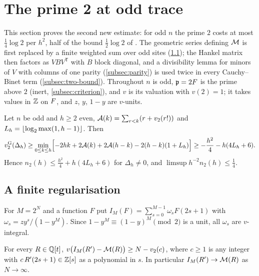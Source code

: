 \section{The prime 2 at odd trace}\label{sec:prime-two}

This section proves the second new estimate: for odd $n$ the prime $2$ costs at most
$\frac14\log2$ per $h^2$, half of the bound $\frac12\log2$ of \cite[Lemma~8.1]{Krisman2026units}.
The geometric series defining $\mathcal{M}$ is first replaced by a finite weighted sum over odd sites
(\cref{subsec:regularisation}); the Hankel matrix then factors as $VBV^{\mathsf T}$ with $B$ block
diagonal, and a divisibility lemma for minors of $V$ with columns of one parity
(\cref{subsec:parity}) is used twice in every Cauchy--Binet term (\cref{subsec:two-bound}).
Throughout $n$ is odd, $\mathfrak p=2F$ is the prime above $2$ (inert, \cref{subsec:criterion}),
and $v$ is its valuation with $v(2)=1$; it takes values in $\mathbb{Z}$ on $F$, and
$z$, $y$, $1-y$ are $v$-units.

\begin{theorem}\label{thm:prime-two}
Let $n$ be odd and $h\ge2$ even, $\mathcal{A}(k)=\sum_{r<k}(r+v_2(r!))$ and $L_h=\left\lfloor \log_2\max(1,h-1)\right\rfloor$.
Then
\begin{equation}\label{eq:two-finite}
v_2^{\mathrm G}(\Delta_h)\ge\min_{0\le k\le h}\Bigl[-2hk+2\mathcal{A}(k)+2\mathcal{A}(h-k)-2(h-k)(1+L_h)\Bigr]
\ge-\frac{h^2}4-h(4L_h+6).
\end{equation}
Hence $n_2(h)\le\frac{h^2}4+h(4L_h+6)$ for $\Delta_h\ne0$, and $\limsup h^{-2}n_2(h)\le\frac14$.
\end{theorem}

\subsection{A finite regularisation}\label{subsec:regularisation}

For $M=2^N$ and a function $F$ put $I_M(F)=\sum_{s=0}^{M-1}\omega_sF(2s+1)$ with
$\omega_s=zy^s/(1-y^M)$. Since $1-y^{M}\equiv(1-y)^{M}\pmod2$ is a unit, all $\omega_s$ are
$v$-integral.

\begin{lemma}\label{lem:regularisation}
For every $R\in\mathbb{Q}[t]$, $v\bigl(I_M(R')-\mathcal{M}(R)\bigr)\ge N-v_2(c)$, where $c\ge1$ is any integer with
$c\,R'(2s+1)\in\mathbb{Z}[s]$ as a polynomial in $s$. In particular $I_M(R')\to\mathcal{M}(R)$ as $N\to\infty$.
\end{lemma}

